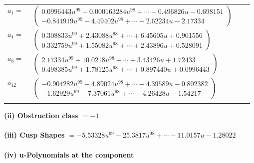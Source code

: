 \documentclass[1p]{elsarticle_modified}
\theoremstyle{definition}
\begin{document}
\begin{tabular}{m{7pt} m{180pt} m{7pt} m{180pt} }
\flushright $a_{1}=$&$\begin{pmatrix}0.0996443 u^{99}-0.000163284 u^{98}+\cdots-0.496826 u-0.698151\\-0.844919 u^{99}-4.49402 u^{98}+\cdots-2.62234 u-2.17334\end{pmatrix}$ \\
\flushright $a_{4}=$&$\begin{pmatrix}0.308833 u^{99}+2.43088 u^{98}+\cdots+6.45605 u+0.901556\\0.332759 u^{99}+1.55082 u^{98}+\cdots+2.43896 u+0.528091\end{pmatrix}$ \\
\flushright $a_{8}=$&$\begin{pmatrix}2.17334 u^{99}+10.0218 u^{98}+\cdots+3.43426 u+1.72433\\0.498385 u^{99}+1.78125 u^{98}+\cdots+0.897440 u+0.0996443\end{pmatrix}$ \\
\flushright $a_{12}=$&$\begin{pmatrix}-0.904282 u^{99}-4.89024 u^{98}+\cdots-4.39589 u-0.802382\\-1.62929 u^{99}-7.37061 u^{98}+\cdots-4.26428 u-1.54217\end{pmatrix}$\\&\end{tabular}
\flushleft \textbf{(ii) Obstruction class $= -1$}\\~\\
\flushleft \textbf{(iii) Cusp Shapes $= -5.53328 u^{99}-25.3817 u^{98}+\cdots-11.0157 u-1.28022$}\\~\\
\newpage\renewcommand{\arraystretch}{1}
\flushleft \textbf{(iv) u-Polynomials at the component}\newline \\
\end{document}
